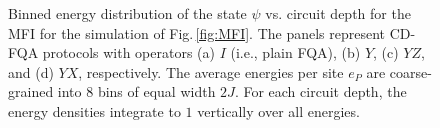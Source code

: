 \documentclass[twocolumn,aps,superscriptaddress,floatfix,longbibliography]{revtex4-2}
\newcommand{\Fig}[1]{Fig.\,\ref{fig:#1}}
\def\YX{\ensuremath{\mathit{YX}}\xspace} %
\def\YZ{\ensuremath{\mathit{YZ}}\xspace}
\begin{document}
\begin{figure}
\caption{
   Binned energy distribution %
   of the state $\psi$  vs. circuit depth for the MFI
   for the simulation of \Fig{MFI}.
   The panels %
   represent CD-FQA protocols with operators
      (a) $I$ (i.e., plain FQA),
      (b) $Y$,
      (c) \YZ, and
      (d) \YX, respectively.
   The average energies per site $e_P$
   are coarse-grained %
   into 8 bins of equal width %
   $2J$. For each circuit depth,
   the energy densities integrate to $1$ vertically
   over all energies.}
\label{fig:MFIcolor}
\end{figure}

 
\end{document}

